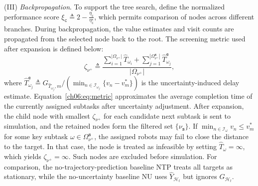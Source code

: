 (III) \emph{Backpropagation}.
To support the tree search, define the normalized performance score
$\xi_{\texttt{c}} \triangleq
2-\frac{\eta_{\texttt{c}}}{\eta_{\texttt{c}}^\star}$,
which permits comparison of nodes across different branches. During
backpropagation, the value estimates and visit counts are propagated
from the selected node back to the root. The screening metric used
after expansion is defined below:
\begin{equation}
\label{ch06:eq:metric}
\zeta_{\nu^{+}} \triangleq
\frac{
\sum_{i=1}^{|\Omega_{\nu^{+}}|}\widehat{T}_{\omega_i}
+
\sum_{j=1}^{|\Omega_{\nu^{+}}^{\texttt{s}}|}
\widehat{T}_{\omega_j}^{\texttt{e}}
}{
|\Omega_{\nu^{+}}|
},
\end{equation}
where
$\widehat{T}_{\omega_j}^{\texttt{e}} \triangleq
G_{\widehat{T}_{\omega_j},m}/
(\min_{n \in \mathcal{I}_{\omega_j}} \{v_n - v_m^{\ast}\})$ is the
uncertainty-induced delay estimate. Equation~\eqref{ch06:eq:metric}
approximates the average completion time of the currently assigned
subtasks after uncertainty adjustment. After expansion, the child node
with smallest $\zeta_{\nu^{+}}$ for each candidate next subtask is sent
to simulation, and the retained nodes form the filtered set
$\{\nu_{\texttt{s}}\}$. If
$\min_{n \in \mathcal{I}_{\omega}} v_n \leq v_m^{\ast}$
for some key subtask $\omega \in \Omega_{\nu^{+}}^{\texttt{s}}$, the
assigned robots may fail to close the distance to the target. In that
case, the node is treated as infeasible by setting
$\widehat{T}_{\omega} = \infty$, which yields
$\zeta_{\nu^{+}} = \infty$. Such nodes are excluded before simulation.
For comparison, the no-trajectory-prediction baseline NTP treats all targets
as stationary, while the no-uncertainty baseline NU uses
$\widehat{Y}_{\mathcal{H}_t}$ but ignores $G_{\mathcal{H}_t}$. 


